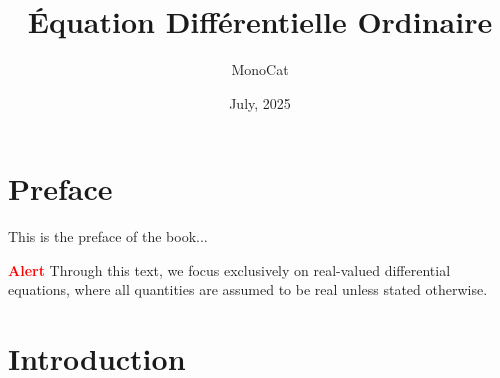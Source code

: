 \documentclass[11pt]{../../TexTemplate/elegantbook}
\title{Équation Différentielle Ordinaire} %
\author{MonoCat} %
\date{July, 2025} %
\begin{document}
\maketitle %

\frontmatter        %
\tableofcontents    %

\chapter{Preface}   %
This is the preface of the book...

\textcolor{red}{\bfseries Alert} Through this text, we focus exclusively on real-valued differential equations, 
where all quantities are assumed to be real unless stated otherwise. 
\mainmatter         %

\chapter{Introduction} %
\end{document}
